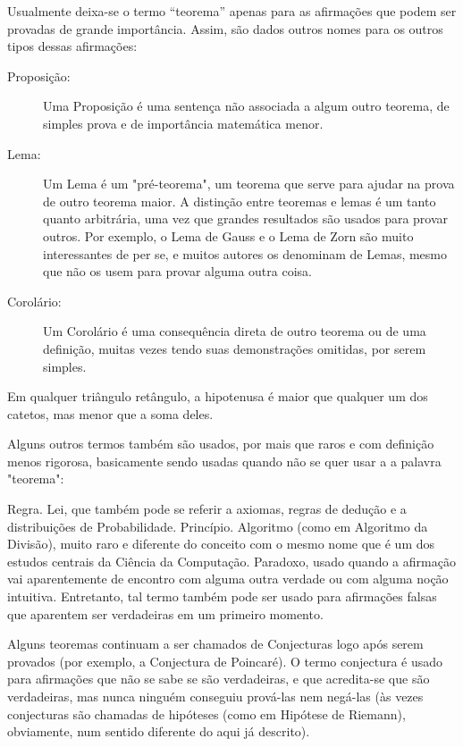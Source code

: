 Usualmente deixa-se o termo ``teorema'' apenas para as afirmações que podem ser provadas de grande importância. Assim, são dados outros nomes para os outros tipos dessas afirmações:

\begin{description}
	\item[Proposição:] Uma Proposição é uma sentença não associada a algum outro teorema, de simples prova e de importância matemática menor.
	\item[Lema:] Um Lema é um "pré-teorema", um teorema que serve para ajudar na prova de outro teorema maior. A distinção entre teoremas e lemas é um tanto quanto arbitrária, uma vez que grandes resultados são usados para provar outros. Por exemplo, o Lema de Gauss e o Lema de Zorn são muito interessantes de per se, e muitos autores os denominam de Lemas, mesmo que não os usem para provar alguma outra coisa.
	\item[Corolário:] Um Corolário é uma consequência direta de outro teorema ou de uma definição, muitas vezes tendo suas demonstrações omitidas, por serem simples.
\end{description}


\begin{corolario}
	Em qualquer triângulo retângulo, a hipotenusa é maior que qualquer um dos catetos, mas menor que a soma deles.
\end{corolario}

Alguns outros termos também são usados, por mais que raros e com definição menos rigorosa, basicamente sendo usadas quando não se quer usar a a palavra "teorema":

Regra.
Lei, que também pode se referir a axiomas, regras de dedução e a distribuições de Probabilidade.
Princípio.
Algoritmo (como em Algoritmo da Divisão), muito raro e diferente do conceito com o mesmo nome que é um dos estudos centrais da Ciência da Computação.
Paradoxo, usado quando a afirmação vai aparentemente de encontro com alguma outra verdade ou com alguma noção intuitiva. Entretanto, tal termo também pode ser usado para afirmações falsas que aparentem ser verdadeiras em um primeiro momento.

Alguns teoremas continuam a ser chamados de Conjecturas logo após serem provados (por exemplo, a Conjectura de Poincaré). O termo conjectura é usado para afirmações que não se sabe se são verdadeiras, e que acredita-se que são verdadeiras, mas nunca ninguém conseguiu prová-las nem negá-las (às vezes conjecturas são chamadas de hipóteses (como em Hipótese de Riemann), obviamente, num sentido diferente do aqui já descrito).


